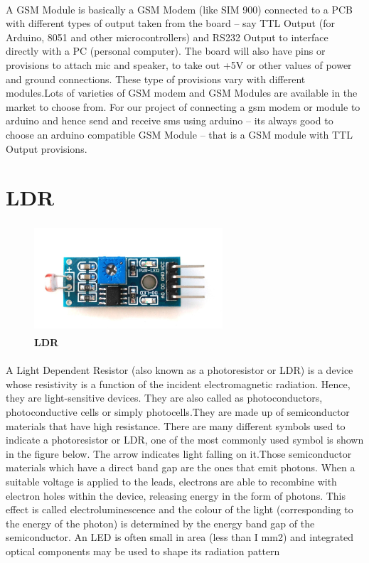 \paragraph{}A GSM Module is basically a GSM Modem (like SIM 900) connected to a PCB with different types of output taken from the board – say TTL Output (for Arduino, 8051 and other microcontrollers) and RS232 Output to interface directly with a PC (personal computer). The board will also have pins or provisions to attach mic and speaker, to take out +5V or other values of power and ground connections. These type of provisions vary with different modules.Lots of varieties of GSM modem and GSM Modules are available in the market to choose from. For our project of connecting a gsm modem or module to arduino and hence send and receive sms using arduino – its always good to choose an arduino compatible GSM Module – that is a GSM module with TTL Output provisions.

\section{LDR}
\begin{figure}[H]
 \centering
    \includegraphics[height= 4cm, width=7cm]{project/images/LDR}
  \caption{\textbf{LDR}}
\end{figure}
\paragraph{}A Light Dependent Resistor (also known as a photoresistor or LDR) is a device whose resistivity is a function of the incident electromagnetic radiation. Hence, they are light-sensitive devices. They are also called as photoconductors, photoconductive cells or simply photocells.They are made up of semiconductor materials that have high resistance. There are many different symbols used to indicate a photoresistor or LDR, one of the most commonly used symbol is shown in the figure below. The arrow indicates light falling on it.Those semiconductor materials which have a direct band gap are the ones that emit photons. When a suitable voltage is applied to the leads, electrons are able to recombine with electron holes within the device, releasing energy in the form  of  photons.  This  effect  is called  electroluminescence  and  the  colour  of  the  light (corresponding to the energy of the photon) is determined by the energy band gap of the semiconductor. An LED is often small in area (less  than I mm2) and integrated optical components may be used to shape its radiation pattern

